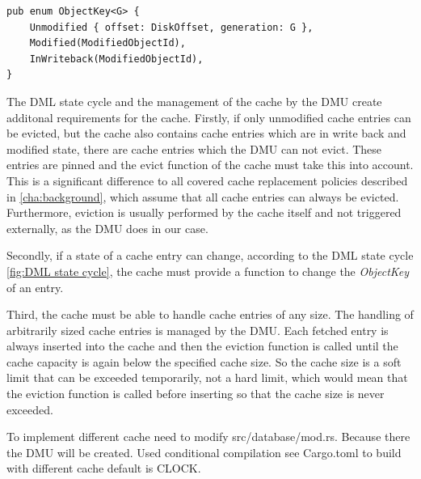 \documentclass[
	12pt,
	a4paper,
	abstract,
	bibliography=totoc,
	chapterprefix,
	headings=openright,
	numbers=endperiod,
	parskip=half,
	twoside,
]{scrreprt}
\begin{document}
\begin{lstlisting}[mathescape=true,caption=ObjectKey enumeration,label=lst:ObjectKey enumeration]
pub enum ObjectKey<G> {
    Unmodified { offset: DiskOffset, generation: G },
    Modified(ModifiedObjectId),
    InWriteback(ModifiedObjectId),
}
\end{lstlisting}

The DML state cycle and the management of the cache by the DMU create additonal requirements for the cache.
Firstly, if only unmodified cache entries can be evicted, but the cache also contains cache entries which are in write back and modified state, there are cache entries which the DMU can not evict.
These entries are pinned and the evict function of the cache must take this into account.
This is a significant difference to all covered cache replacement policies described in \ref{cha:background}, which assume that all cache entries can always be evicted. Furthermore, eviction is usually performed by the cache itself and not triggered externally, as the DMU does in our case.

Secondly, if a state of a cache entry can change, according to the DML state cycle \ref{fig:DML state cycle}, the cache must provide a function to change the \emph{ObjectKey} of an entry.

Third, the cache must be able to handle cache entries of any size.
The handling of arbitrarily sized cache entries is managed by the DMU.
Each fetched entry is always inserted into the cache and then the eviction function is called until the cache capacity is again below the specified cache size.
So the cache size is a soft limit that can be exceeded temporarily, not a hard limit, which would mean that the eviction function
is called before inserting so that the cache size is never exceeded.






















To implement different cache need to modify src/database/mod.rs.
Because there the DMU will be created.
Used conditional compilation see Cargo.toml to build with different cache default is CLOCK.
\end{document}
